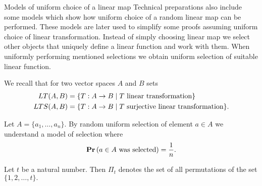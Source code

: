 \begin{section}{Models of uniform choice of a linear map}
Technical preparations also include some models which show how uniform choice of a random linear map can be performed. These models are later used to simplify some proofs assuming uniform choice of linear transformation. Instead of simply choosing linear map we select other objects that uniquely define a linear function and work with them. When uniformly performing mentioned selections we obtain uniform selection of suitable linear function.

We recall that for two vector spaces $A$ and $B$ sets 
\[
\begin{split}
LT(A, B) & = \{ T: A \rightarrow B \mid T \text{ linear transformation} \} \\
LTS(A, B) & = \{ T: A \rightarrow B \mid T \text{ surjective linear transformation} \} \text{.}
\end{split}
\]

\begin{definition}
Let $A = \{ a_1, \dots, a_n \}$. By random uniform selection of element $a \in A$ we understand a model of selection where 
\[
	\mathbf{Pr}\left(a \in A \text{ was selected}\right) = \frac{1}{n} \text{.}
\]
\end{definition}

\begin{definition}
Let $t$ be a natural number. Then $\Pi_t$ denotes the set of all permutations of the set $\{1, 2, \dots, t\}.$
\end{definition}


\end{section}
